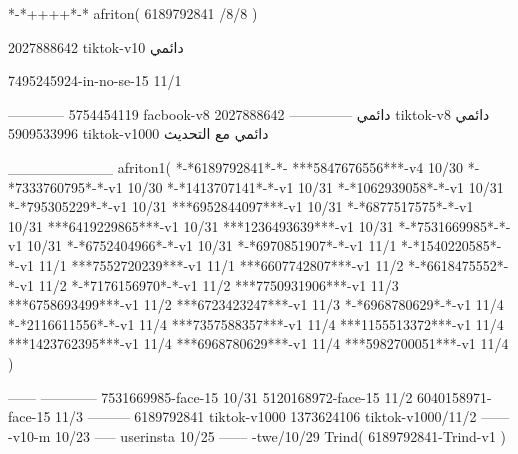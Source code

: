 *-*++++*-*
afriton(
6189792841 /8/8
)

2027888642 tiktok-v10
دائمي


7495245924-in-no-se-15 11/1

------------
5754454119 facbook-v8
دائمي
--------------
2027888642 tiktok-v8
دائمي
5909533996 tiktok-v1000
دائمي مع التحديث

__________
afriton1(
*-*6189792841*-*-
***5847676556***-v4 10/30
*-*7333760795*-*-v1 10/30
*-*1413707141*-*-v1 10/31
*-*1062939058*-*-v1 10/31
*-*795305229*-*-v1 10/31
***6952844097***-v1 10/31
*-*6877517575*-*-v1 10/31
***6419229865***-v1 10/31
***1236493639***-v1 10/31
*-*7531669985*-*-v1 10/31
*-*6752404966*-*-v1 10/31
*-*6970851907*-*-v1 11/1
*-*1540220585*-*-v1 11/1
***7552720239***-v1 11/1
***6607742807***-v1 11/2
*-*6618475552*-*-v1 11/2
*-*7176156970*-*-v1 11/2
***7750931906***-v1 11/3
***6758693499***-v1 11/2
***6723423247***-v1 11/3
*-*6968780629*-*-v1 11/4
*-*2116611556*-*-v1 11/4
***7357588357***-v1 11/4
***1155513372***-v1 11/4
***1423762395***-v1 11/4
***6968780629***-v1 11/4
***5982700051***-v1 11/4
)

------
------------
7531669985-face-15 10/31
5120168972-face-15 11/2
6040158971-face-15 11/3
---------
6189792841 tiktok-v1000
1373624106 tiktok-v1000/11/2
------
-v10-m 10/23
-----
userinsta 10/25
------
-twe/10/29
Trind(
6189792841-Trind-v1 
)
